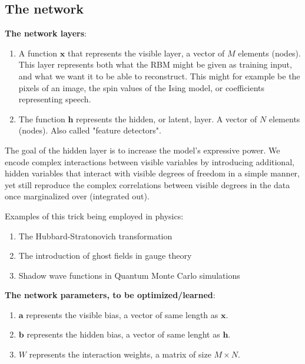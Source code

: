 \documentclass[%
oneside,                 %
final,                   %
10pt]{article}
\begin{document}
\subsection{The network}

\textbf{The network layers}:
\begin{enumerate}
 \item A function $\mathbf{x}$ that represents the visible layer, a vector of $M$ elements (nodes). This layer represents both what the RBM might be given as training input, and what we want it to be able to reconstruct. This might for example be the pixels of an image, the spin values of the Ising model, or coefficients representing speech.

 \item The function $\mathbf{h}$ represents the hidden, or latent, layer. A vector of $N$ elements (nodes). Also called "feature detectors".
\end{enumerate}

\noindent
The goal of the hidden layer is to increase the model's expressive power. We encode complex interactions between visible variables by introducing additional, hidden variables that interact with visible degrees of freedom in a simple manner, yet still reproduce the complex correlations between visible degrees in the data once marginalized over (integrated out).

Examples of this trick being employed in physics: 
\begin{enumerate}
 \item The Hubbard-Stratonovich transformation

 \item The introduction of ghost fields in gauge theory

 \item Shadow wave functions in Quantum Monte Carlo simulations
\end{enumerate}

\noindent
\textbf{The network parameters, to be optimized/learned}:
\begin{enumerate}
 \item $\mathbf{a}$ represents the visible bias, a vector of same length as $\mathbf{x}$.

 \item $\mathbf{b}$ represents the hidden bias, a vector of same lenght as $\mathbf{h}$.

 \item $W$ represents the interaction weights, a matrix of size $M\times N$.
\end{enumerate}
\end{document}
